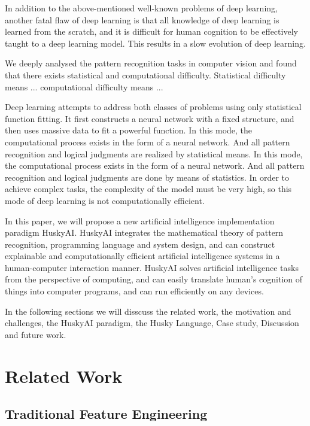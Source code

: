 \documentclass[11pt]{article} 	%
\theoremstyle{definition}
\begin{document}
In addition to the above-mentioned well-known problems of deep learning, another fatal flaw of deep learning is that all knowledge of deep learning is learned from the scratch, and it is difficult for human cognition to be effectively taught to a deep learning model. This results in a slow evolution of deep learning.

We deeply analysed the  pattern recognition tasks in computer vision and found that  there exists statistical and computational difficulty. 
Statistical difficulty means ... 
 computational difficulty means ...
 
Deep learning attempts to address both classes of problems using only statistical function fitting.  It first constructs a neural network with a fixed structure, and then uses massive data to fit a powerful function.  In this mode, the computational process exists in the form of a neural network. And all pattern recognition and logical judgments are realized by statistical means. In this mode, the computational process exists in the form of a neural network. And all pattern recognition and logical judgments are done by means of statistics. In order to achieve complex tasks, the complexity of the model must be very high, so this mode of deep learning is not computationally efficient.

In this paper, we will propose a new artificial intelligence implementation paradigm HuskyAI. HuskyAI integrates the mathematical theory of pattern recognition, programming language and system design, and can construct explainable and computationally efficient artificial intelligence systems in a human-computer interaction manner.  HuskyAI solves artificial intelligence tasks from the perspective of computing, and can easily translate human's cognition of things into computer programs, and can run efficiently on any devices.

In the following sections we will disscuss
 the related work, 
 the motivation and challenges, 
 the HuskyAI paradigm,  
 the Husky Language,
 Case study,
 Discussion and future work.


\section{Related Work}

\subsection{Traditional Feature Engineering}
\end{document}
